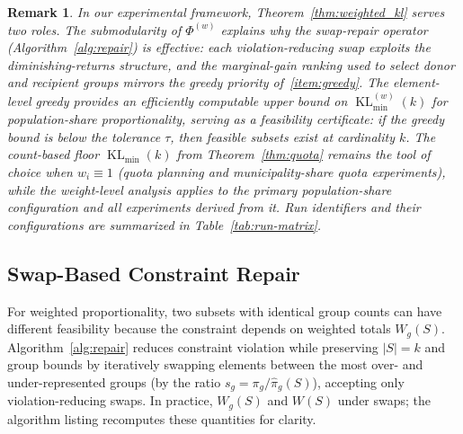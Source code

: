 \documentclass[10pt,journal]{IEEEtran}
\newcommand{\1}{\mathbf{1}}
\DeclareMathOperator{\KL}{KL}
\theoremstyle{ieeethm}
\newtheorem{remark}{Remark}
\begin{document}
\begin{remark}
\label{rem:weighted_planning_role}
In our experimental framework, Theorem~\ref{thm:weighted_kl} serves two roles.
The submodularity of $\Phi^{(w)}$ explains why the swap-repair operator
(Algorithm~\ref{alg:repair}) is effective: each violation-reducing swap exploits the
diminishing-returns structure, and the marginal-gain ranking used to select donor and
recipient groups mirrors the greedy priority of~\ref{item:greedy}.
The element-level greedy provides an efficiently computable upper bound on
$\KL^{(w)}_{\min}(k)$ for population-share proportionality, serving as a feasibility
certificate: if the greedy bound is below the tolerance $\tau$, then feasible subsets
exist at cardinality $k$. The count-based floor
$\KL_{\min}(k)$ from Theorem~\ref{thm:quota} remains the tool of choice when
$w_i\equiv 1$ (quota planning and municipality-share quota experiments), while the weight-level analysis applies to the primary
population-share configuration and all experiments derived from it.
Run identifiers and their configurations are summarized in Table~\ref{tab:run-matrix}.
\end{remark}

\subsection{Swap-Based Constraint Repair}
\label{subsec:repair_streamlined}

For weighted proportionality, two subsets with identical group counts can have different feasibility because the constraint depends on weighted totals $W_g(S)$.
Algorithm~\ref{alg:repair} reduces constraint violation while preserving $|S|=k$ and group bounds by iteratively swapping elements between the most over- and under-represented groups (by the ratio $s_g=\pi_g/\hat\pi_g(S)$), accepting only violation-reducing swaps. In practice, $W_g(S)$ and $W(S)$
under swaps; the algorithm listing recomputes these quantities for clarity.
\end{document}
